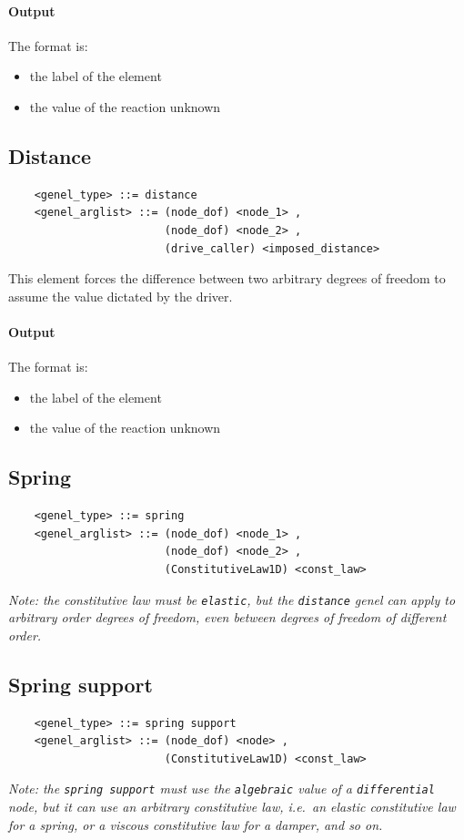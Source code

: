 \paragraph{Output}
The format is:
\begin{itemize}
    \item the label of the element
    \item the value of the reaction unknown
\end{itemize}
  
\subsection{Distance}
\begin{verbatim}
    <genel_type> ::= distance
    <genel_arglist> ::= (node_dof) <node_1> ,
                        (node_dof) <node_2> ,
                        (drive_caller) <imposed_distance>
\end{verbatim}
This element forces the difference between two arbitrary degrees of freedom
to assume the value dictated by the driver.

\paragraph{Output}
The format is:
\begin{itemize}
    \item the label of the element
    \item the value of the reaction unknown
\end{itemize}
  
  
\subsection{Spring}
\begin{verbatim}
    <genel_type> ::= spring
    <genel_arglist> ::= (node_dof) <node_1> ,
                        (node_dof) <node_2> ,
                        (ConstitutiveLaw1D) <const_law>
\end{verbatim}
{\em 
    Note: the constitutive law must be \texttt{elastic}, but the \texttt{distance}
    genel can apply to arbitrary order degrees of freedom, even between degrees 
    of freedom of different order.
}

\subsection{Spring support}
\begin{verbatim}
    <genel_type> ::= spring support
    <genel_arglist> ::= (node_dof) <node> ,                      
                        (ConstitutiveLaw1D) <const_law>
\end{verbatim}
{\em
    Note: the \texttt{spring support} must use the \texttt{algebraic} value of a 
    \texttt{differential} node, but it can use an arbitrary constitutive law,
    i.e.\ an elastic constitutive law for a spring, or a viscous
    constitutive law for a damper, and so on.
}

